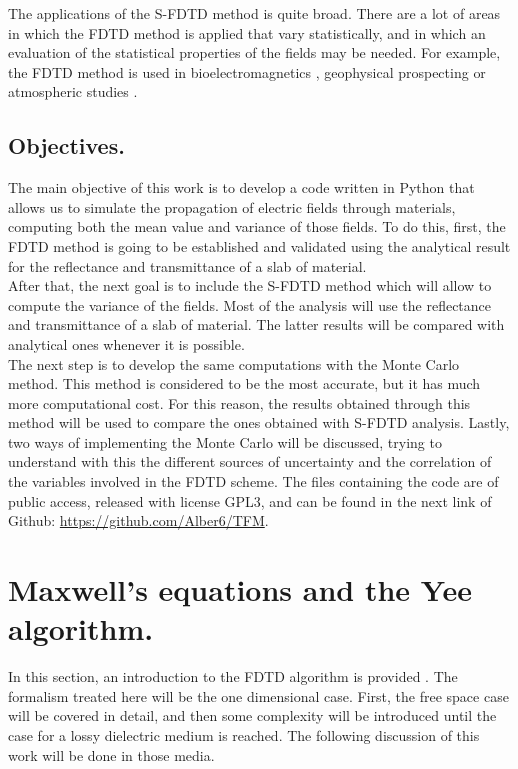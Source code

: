 \documentclass[12pt, oneside]{book}
\begin{document}
\indent The applications of the S-FDTD method is quite broad. There are a lot of areas in which the FDTD method is applied that vary statistically, and in which an evaluation of the statistical properties of the fields may be needed. For example, the FDTD method is used in bioelectromagnetics \cite{gandhi1996electromagnetic,furse1996fdtd,Christ2005}, geophysical prospecting \cite{johnson2001cross} or atmospheric studies \cite{simpson2007review}.

\section{Objectives.}

The main objective of this work is to develop a code written in Python that allows us to simulate the propagation of electric fields through materials, computing both the mean value and variance of those fields. To do this, first, the FDTD method is going to be established and validated using the analytical result for the reflectance and transmittance of a slab of material. \\
\indent After that, the next goal is to include the S-FDTD method which will allow to compute the variance of the fields.
Most of the analysis will use the reflectance and transmittance of a slab of material. The latter results will be compared with analytical ones whenever it is possible. \\
\indent The next step is to develop the same computations with the Monte Carlo method. This method is considered to be the most accurate, but it has much more computational cost. For this reason, the results obtained through this method will be used to compare the ones obtained with S-FDTD analysis. Lastly, two ways of implementing the Monte Carlo will be discussed,  trying to understand with this the different sources of uncertainty and the correlation of the variables involved in the FDTD scheme.
\indent The files containing the code are of public access, released with license GPL3, and can be found in the next link of Github: \url{https://github.com/Alber6/TFM}.


\chapter{Maxwell's equations and the Yee algorithm.}

In this section, an introduction to the FDTD algorithm is provided \cite{yee1966numerical}. The formalism treated here will be the one dimensional case. First, the free space case will be covered in detail, and then some complexity will be introduced until the case for a lossy dielectric medium is reached. The following discussion of this work will be done in those media.
\end{document}
